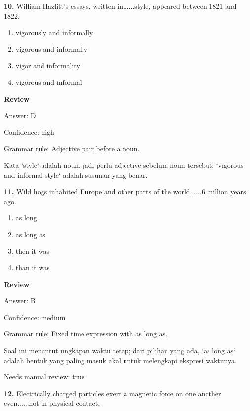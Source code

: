 \documentclass[12pt]{article}
\begin{document}
\endgroup
\par
\vspace{0.25\baselineskip}
\noindent\textbf{10.} William Hazlitt's essays, written in......style, appeared between 1821 and 1822.
\begin{enumerate}[label=(\Alph*),leftmargin=*,itemsep=0.2em]
\item vigorously and informally
\item vigorous and informally
\item vigor and informality
\item vigorous and informal
\end{enumerate}
\par
\begingroup
\setlength{\parskip}{0pt}
\setlength{\parindent}{0pt}
\textbf{Review}\par
Answer: D\par
Confidence: high\par
Grammar rule: Adjective pair before a noun.\par
Kata `style` adalah noun, jadi perlu adjective sebelum noun tersebut; `vigorous and informal style` adalah susunan yang benar.\par
\endgroup
\par
\vspace{0.25\baselineskip}
\noindent\textbf{11.} Wild hogs inhabited Europe and other parts of the world......6 million years ago.
\begin{enumerate}[label=(\Alph*),leftmargin=*,itemsep=0.2em]
\item as long
\item as long as
\item then it was
\item than it was
\end{enumerate}
\par
\begingroup
\setlength{\parskip}{0pt}
\setlength{\parindent}{0pt}
\textbf{Review}\par
Answer: B\par
Confidence: medium\par
Grammar rule: Fixed time expression with as long as.\par
Soal ini menuntut ungkapan waktu tetap; dari pilihan yang ada, `as long as` adalah bentuk yang paling masuk akal untuk melengkapi ekspresi waktunya.\par
Needs manual review: true\par
\endgroup
\par
\vspace{0.25\baselineskip}
\noindent\textbf{12.} Electrically charged particles exert a magnetic force on one another even......not in physical contact.
\end{document}
